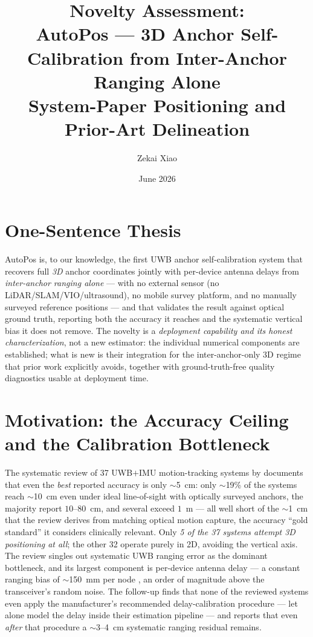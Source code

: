 \documentclass[11pt,a4paper]{article}
\title{Novelty Assessment:\\
       AutoPos --- 3D Anchor Self-Calibration from Inter-Anchor Ranging Alone\\[5pt]
       \large System-Paper Positioning and Prior-Art Delineation}
\author{Zekai Xiao}
\date{June 2026}
\begin{document}
\maketitle

\section{One-Sentence Thesis}

AutoPos is, to our knowledge, the first UWB anchor self-calibration system that recovers full
\emph{3D} anchor coordinates jointly with per-device antenna delays from \emph{inter-anchor ranging
alone} --- with no external sensor (no LiDAR/SLAM/VIO/ultrasound), no mobile survey platform, and no
manually surveyed reference positions --- and that validates the result against optical ground
truth, reporting both the accuracy it reaches and the systematic vertical bias it does not remove.
The novelty is a \emph{deployment capability and its honest characterization}, not a new estimator:
the individual numerical components are established; what is new is their integration for the
inter-anchor-only 3D regime that prior work explicitly avoids, together with ground-truth-free
quality diagnostics usable at deployment time.

\section{Motivation: the Accuracy Ceiling and the Calibration Bottleneck}

The systematic review of 37 UWB$+$IMU motion-tracking systems by \citet{yogesh_2023} documents that
even the \emph{best} reported accuracy is only $\sim$5~cm: only $\sim$19\% of the systems reach
$\sim$10~cm even under ideal line-of-sight with optically surveyed anchors, the majority report
$10$--$80$~cm, and several exceed $1$~m --- all well short of the $\sim$1~cm that the review derives
from matching optical motion capture, the accuracy ``gold standard'' it considers clinically relevant. Only \emph{5 of the 37 systems attempt 3D positioning at all}; the other 32
operate purely in 2D, avoiding the vertical axis. The review singles out systematic UWB ranging error
as the dominant bottleneck, and its largest component is per-device antenna delay --- a constant
ranging bias of $\sim$150~mm per node \citep{shah_2021,sang_2019}, an order of magnitude above the
transceiver's random noise. The follow-up \citep{yogesh_2024} finds that none of the reviewed
systems even apply the manufacturer's recommended delay-calibration procedure --- let alone model
the delay inside their estimation pipeline --- and reports that even \emph{after} that procedure a
$\sim$3--4~cm systematic ranging residual remains.
\end{document}
